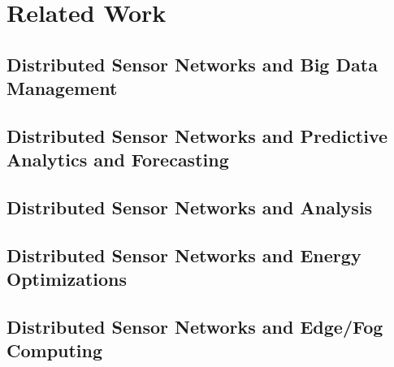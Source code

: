 \chapter{Related Work}

\section{Distributed Sensor Networks and Big Data Management}

\section{Distributed Sensor Networks and Predictive Analytics and Forecasting}

\section{Distributed Sensor Networks and Analysis}

\section{Distributed Sensor Networks and Energy Optimizations}

\section{Distributed Sensor Networks and Edge/Fog Computing}



